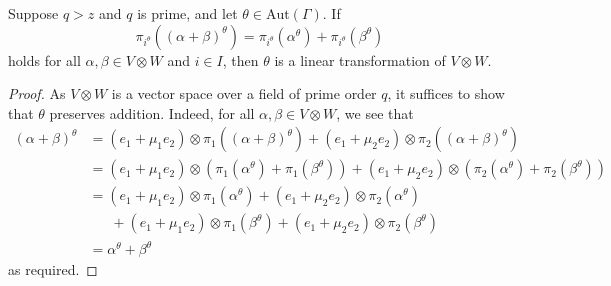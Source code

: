 \documentclass[ALCO, Unicode]{cedram}
\newcommand{\Aut}{\mathrm{Aut}}
\begin{document}
\begin{lemma} \label{lm:automorphism-linear-sufficiency}
Suppose $q > z$ and $q$ is prime, and let $\theta \in \Aut{\left(\Gamma \right)}$. If
\begin{displaymath}
    \pi_{i^\theta}{\left(\left(\alpha + \beta \right)^\theta \right)} = \pi_{i^\theta}{\left(\alpha^\theta \right)} + \pi_{i^\theta}{\left(\beta^\theta \right)}
\end{displaymath}
holds for all $\alpha, \beta \in V \otimes W$ and $i \in I$, then $\theta$ is a linear transformation of $V \otimes W$.
\end{lemma}
\begin{proof}
As $V \otimes W$ is a vector space over a field of prime order $q$, it suffices to show that $\theta$ preserves addition. Indeed, for all $\alpha, \beta \in V \otimes W$, we see that
\begin{align*}
    \left(\alpha + \beta \right)^\theta &= \left(e_1 + \mu_1 e_2 \right) \otimes \pi_1{\left(\left(\alpha + \beta \right)^\theta \right)} + \left(e_1 + \mu_2 e_2 \right) \otimes \pi_2{\left(\left(\alpha + \beta \right)^\theta \right)} \\
    &= \left(e_1 + \mu_1 e_2 \right) \otimes \left(\pi_1{\left(\alpha^\theta \right)} + \pi_1{\left(\beta^\theta \right)}\right) + \left(e_1 + \mu_2 e_2 \right) \otimes \left(\pi_2{\left(\alpha^\theta \right)} + \pi_2{\left(\beta^\theta \right)}\right) \\
    &= \left(e_1 + \mu_1 e_2 \right) \otimes \pi_1{\left(\alpha^\theta \right)} + \left(e_1 + \mu_2 e_2 \right) \otimes \pi_2{\left(\alpha^\theta \right)} \\
    &\ \ \ \ \ \ \ + \left(e_1 + \mu_1 e_2 \right) \otimes \pi_1{\left(\beta^\theta \right)} + \left(e_1 + \mu_2 e_2 \right) \otimes \pi_2{\left(\beta^\theta \right)} \\
    &= \alpha^\theta + \beta^\theta
\end{align*}
as required.
\end{proof}
\end{document}
